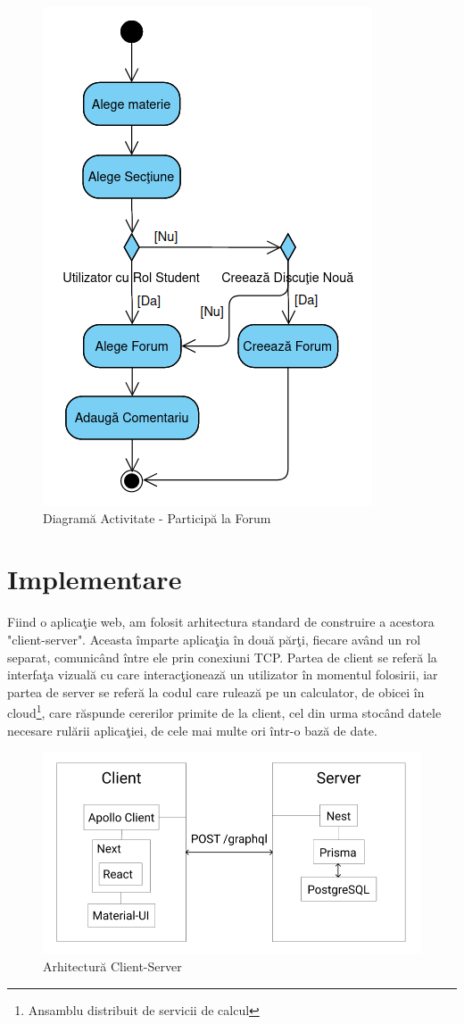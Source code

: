 \documentclass[12pt, a4paper, oneside, romanian]{teza-upb}
\begin{document}
\begin{figure}[H]
\centering
\includegraphics*[width=0.5\columnwidth]{diagrama-activitate-participa-la-forum}
\caption{Diagramă Activitate - Participă la Forum}
\label{diagrama-activitate-participa-la-forum}
\end{figure}

\chapter{Implementare}

Fiind o aplicaţie web, am folosit arhitectura standard de construire a acestora "client-server". Aceasta împarte aplicaţia în două părţi, fiecare având un rol separat, comunicând între ele prin conexiuni TCP. Partea de client se referă la interfaţa vizuală cu care interacţionează un utilizator în momentul folosirii, iar partea de server se referă la codul care rulează pe un calculator, de obicei în cloud\footnote{Ansamblu distribuit de servicii de calcul}, care răspunde cererilor primite de la client, cel din urma stocând datele necesare rulării aplicaţiei, de cele mai multe ori într-o bază de date.

\begin{figure}[H]
\centering
\includegraphics*[width=0.7\columnwidth]{arhitectura-client-server}
\caption{Arhitectură Client-Server}
\label{arhitectura-client-server}
\end{figure}
\end{document}
